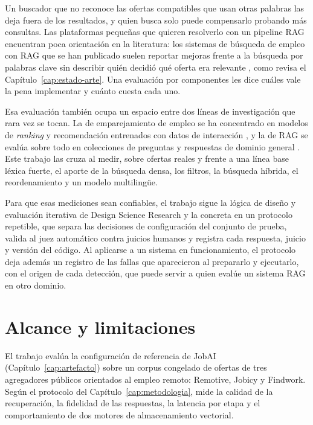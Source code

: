 Un buscador que no reconoce las ofertas compatibles que usan otras palabras las deja fuera de los resultados, y quien busca solo puede compensarlo probando más consultas. Las plataformas pequeñas que quieren resolverlo con un pipeline RAG encuentran poca orientación en la literatura: los sistemas de búsqueda de empleo con RAG que se han publicado suelen reportar mejoras frente a la búsqueda por palabras clave sin describir quién decidió qué oferta era relevante \citep{Yoruk2025,Srihari2025JobSphere}, como revisa el Capítulo~\ref{cap:estado-arte}. Una evaluación por componentes les dice cuáles vale la pena implementar y cuánto cuesta cada uno.

Esa evaluación también ocupa un espacio entre dos líneas de investigación que rara vez se tocan. La de emparejamiento de empleo se ha concentrado en modelos de \textit{ranking} y recomendación entrenados con datos de interacción \citep{HaThuc2017,Shen2024,Bocharova2023}, y la de RAG se evalúa sobre todo en colecciones de preguntas y respuestas de dominio general \citep{Gao2023}. Este trabajo las cruza al medir, sobre ofertas reales y frente a una línea base léxica fuerte, el aporte de la búsqueda densa, los filtros, la búsqueda híbrida, el reordenamiento y un modelo multilingüe.

Para que esas mediciones sean confiables, el trabajo sigue la lógica de diseño y evaluación iterativa de Design Science Research \citep{Hevner2004} y la concreta en un protocolo repetible, que separa las decisiones de configuración del conjunto de prueba, valida al juez automático contra juicios humanos y registra cada respuesta, juicio y versión del código. Al aplicarse a un sistema en funcionamiento, el protocolo deja además un registro de las fallas que aparecieron al prepararlo y ejecutarlo, con el origen de cada detección, que puede servir a quien evalúe un sistema RAG en otro dominio.

\section{Alcance y limitaciones}
\label{sec:alcance}

El trabajo evalúa la configuración de referencia de JobAI (Capítulo~\ref{cap:artefacto}) sobre un corpus congelado de ofertas de tres agregadores públicos orientados al empleo remoto: Remotive, Jobicy y Findwork. Según el protocolo del Capítulo~\ref{cap:metodologia}, mide la calidad de la recuperación, la fidelidad de las respuestas, la latencia por etapa y el comportamiento de dos motores de almacenamiento vectorial.

